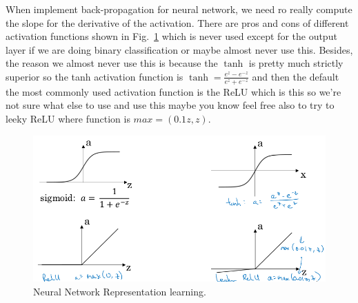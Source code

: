 \documentclass[a4paper]{article}
\begin{document}
When implement back-propagation for neural network, we need ro really compute the slope for the derivative of the activation. There are pros and cons of different activation functions shown in Fig.~\ref{p15} which is never used except for the output layer if we are doing binary classification or maybe almost never use this. Besides, the reason we almost never use this is because the $\tanh$ is pretty much strictly superior so the tanh activation function is $\tanh=\frac{e^z-e^{-z}}{e^z+e^{-z}}$ and then the default the most commonly used activation function is the ReLU which is this so we're not sure what else to use and use this maybe you know feel free also to try to leeky ReLU where function is $max=(0.1z,z)$.
 \begin{figure}
 	\begin{center}
 		\includegraphics[scale=0.4]{figures/16.png}
 	\end{center}
 	\caption{Neural Network Representation learning.}
 	\label{p15}
 \end{figure}
 
\end{document}
